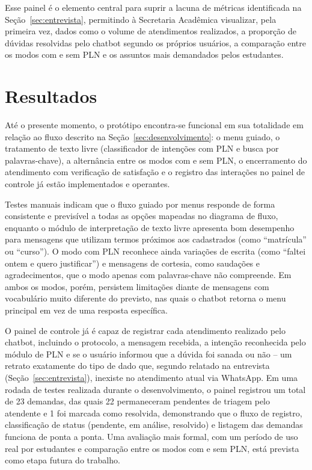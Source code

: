 \documentclass[12pt]{article}
\begin{document}

Esse painel é o elemento central para suprir a lacuna de métricas
identificada na Seção~\ref{sec:entrevista}, permitindo à Secretaria
Acadêmica visualizar, pela primeira vez, dados como o volume de
atendimentos realizados, a proporção de dúvidas resolvidas pelo chatbot
segundo os próprios usuários, a comparação entre os modos com e sem PLN e
os assuntos mais demandados pelos estudantes.

\section{Resultados}\label{sec:resultados}

Até o presente momento, o protótipo encontra-se funcional em sua
totalidade em relação ao fluxo descrito na Seção~\ref{sec:desenvolvimento}: o menu guiado, o tratamento de texto livre (classificador de intenções com PLN e busca por palavras-chave), a alternância entre os modos com e sem PLN, o encerramento do atendimento com verificação de
satisfação e o registro das interações no painel de controle já estão
implementados e operantes.

Testes manuais indicam que o fluxo guiado por menus responde de forma
consistente e previsível a todas as opções mapeadas no diagrama de fluxo,
enquanto o módulo de interpretação de texto livre apresenta bom desempenho para mensagens que utilizam termos próximos aos cadastrados (como ``matrícula'' ou ``curso''). O modo com PLN reconhece ainda variações de escrita (como ``faltei ontem e quero justificar'') e mensagens de cortesia, como saudações e agradecimentos, que o modo apenas com palavras-chave não compreende. Em ambos os modos, porém, persistem limitações diante de mensagens com vocabulário muito diferente do previsto, nas quais o chatbot retorna o menu principal em vez de uma resposta específica.

O painel de controle já é capaz de registrar cada atendimento realizado
pelo chatbot, incluindo o protocolo, a mensagem recebida, a intenção reconhecida pelo módulo de PLN e se o usuário informou que a dúvida foi sanada ou não -- um retrato exatamente do tipo de dado que, segundo
relatado na entrevista (Seção~\ref{sec:entrevista}), inexiste no atendimento atual via
WhatsApp. Em uma rodada de testes realizada durante o desenvolvimento, o
painel registrou um total de 23 demandas, das quais 22 permaneceram
pendentes de triagem pelo atendente e 1 foi marcada como resolvida,
demonstrando que o fluxo de registro, classificação de status (pendente,
em análise, resolvido) e listagem das demandas funciona de ponta a ponta.
Uma avaliação mais formal, com um período de uso real por estudantes e
comparação entre os modos com e sem PLN, está prevista como etapa futura
do trabalho.
\end{document}
